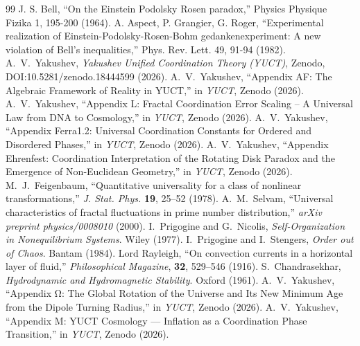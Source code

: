 \documentclass[11pt,a4paper]{article}
\begin{document}
\begin{thebibliography}{99}
 J. S. Bell, ``On the Einstein Podolsky Rosen paradox,'' Physics Physique Fizika 1, 195-200 (1964).
 A. Aspect, P. Grangier, G. Roger, ``Experimental realization of Einstein-Podolsky-Rosen-Bohm gedankenexperiment: A new violation of Bell's inequalities,'' Phys. Rev. Lett. 49, 91-94 (1982).
 A.~V.~Yakushev, \emph{Yakushev Unified Coordination Theory (YUCT)}, Zenodo, DOI:10.5281/zenodo.18444599 (2026).
 A.~V.~Yakushev, ``Appendix AF: The Algebraic Framework of Reality in YUCT,'' in \emph{YUCT}, Zenodo (2026).
 A.~V.~Yakushev, ``Appendix L: Fractal Coordination Error Scaling – A Universal Law from DNA to Cosmology,'' in \emph{YUCT}, Zenodo (2026).
 A.~V.~Yakushev, ``Appendix Ferra1.2: Universal Coordination Constants for Ordered and Disordered Phases,'' in \emph{YUCT}, Zenodo (2026).
 A.~V.~Yakushev, ``Appendix Ehrenfest: Coordination Interpretation of the Rotating Disk Paradox and the Emergence of Non‑Euclidean Geometry,'' in \emph{YUCT}, Zenodo (2026).
 M.~J.~Feigenbaum, ``Quantitative universality for a class of nonlinear transformations,'' \emph{J. Stat. Phys.} \textbf{19}, 25--52 (1978).
 A.~M.~Selvam, ``Universal characteristics of fractal fluctuations in prime number distribution,'' \emph{arXiv preprint physics/0008010} (2000).
 I.~Prigogine and G.~Nicolis, \emph{Self-Organization in Nonequilibrium Systems}. Wiley (1977).
 I.~Prigogine and I.~Stengers, \emph{Order out of Chaos}. Bantam (1984).
 Lord Rayleigh, ``On convection currents in a horizontal layer of fluid,'' \emph{Philosophical Magazine}, \textbf{32}, 529--546 (1916).
 S.~Chandrasekhar, \emph{Hydrodynamic and Hydromagnetic Stability}. Oxford (1961).
 A.~V.~Yakushev, ``Appendix Ω: The Global Rotation of the Universe and Its New Minimum Age from the Dipole Turning Radius,'' in \emph{YUCT}, Zenodo (2026).
 A.~V.~Yakushev, ``Appendix M: YUCT Cosmology — Inflation as a Coordination Phase Transition,'' in \emph{YUCT}, Zenodo (2026).
\end{thebibliography}

\end{document}
